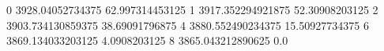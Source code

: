 0 3928.04052734375 62.997314453125
1 3917.352294921875 52.30908203125
2 3903.734130859375 38.69091796875
4 3880.552490234375 15.50927734375
6 3869.134033203125 4.0908203125
8 3865.043212890625 0.0
